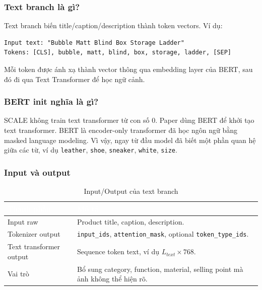 \documentclass[12pt,a4paper]{article}
\begin{document}
\subsubsection{Text branch là gì?}
Text branch biến title/caption/description thành token vectors. Ví dụ:

\begin{lstlisting}
Input text: "Bubble Matt Blind Box Storage Ladder"
Tokens: [CLS], bubble, matt, blind, box, storage, ladder, [SEP]
\end{lstlisting}

Mỗi token được ánh xạ thành vector thông qua embedding layer của BERT, sau đó đi qua Text Transformer để học ngữ cảnh.

\subsubsection{BERT init nghĩa là gì?}
SCALE không train text transformer từ con số 0. Paper dùng BERT để khởi tạo text transformer. BERT là encoder-only transformer đã học ngôn ngữ bằng masked language modeling. Vì vậy, ngay từ đầu model đã biết một phần quan hệ giữa các từ, ví dụ \texttt{leather}, \texttt{shoe}, \texttt{sneaker}, \texttt{white}, \texttt{size}.

\subsubsection{Input và output}
\begin{table}[htbp]
\centering
\begin{tabularx}{\linewidth}{@{}L{3.6cm}Y@{}}
\toprule
{}
\textcolor{white}{\textbf{Thành phần}} & \textcolor{white}{\textbf{Mô tả}} \\
\midrule
Input raw & Product title, caption, description. \\
Tokenizer output & \texttt{input\_ids}, \texttt{attention\_mask}, optional \texttt{token\_type\_ids}. \\
Text transformer output & Sequence token text, ví dụ $L_{text} \times 768$. \\
Vai trò & Bổ sung category, function, material, selling point mà ảnh không thể hiện rõ. \\
\bottomrule
\end{tabularx}
\caption{Input/Output của text branch}
\end{table}
\end{document}
